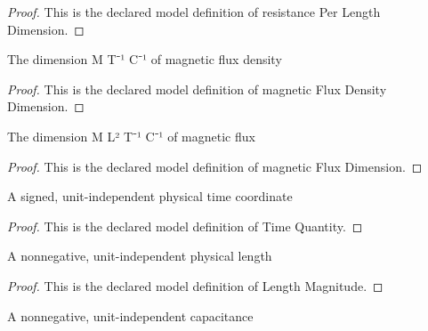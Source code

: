 \begin{proof}
  This is the declared model definition of resistance Per Length Dimension.
\end{proof}
\begin{definition}
  \label{def:physics:phyx-mini-0974:phyxminiproblems-problemphyxmini0974-magneticfluxdensitydimension}
  The dimension M T⁻¹ C⁻¹ of magnetic flux density
\end{definition}
\begin{proof}
  This is the declared model definition of magnetic Flux Density Dimension.
\end{proof}
\begin{definition}
  \label{def:physics:phyx-mini-0974:phyxminiproblems-problemphyxmini0974-magneticfluxdimension}
  The dimension M L² T⁻¹ C⁻¹ of magnetic flux
\end{definition}
\begin{proof}
  This is the declared model definition of magnetic Flux Dimension.
\end{proof}
\begin{definition}
  \label{def:physics:phyx-mini-0974:phyxminiproblems-problemphyxmini0974-timequantity}
  A signed, unit-independent physical time coordinate
\end{definition}
\begin{proof}
  This is the declared model definition of Time Quantity.
\end{proof}
\begin{definition}
  \label{def:physics:phyx-mini-0974:phyxminiproblems-problemphyxmini0974-lengthmagnitude}
  A nonnegative, unit-independent physical length
\end{definition}
\begin{proof}
  This is the declared model definition of Length Magnitude.
\end{proof}
\begin{definition}
  \label{def:physics:phyx-mini-0974:phyxminiproblems-problemphyxmini0974-capacitancemagnitude}
  A nonnegative, unit-independent capacitance
\end{definition}
